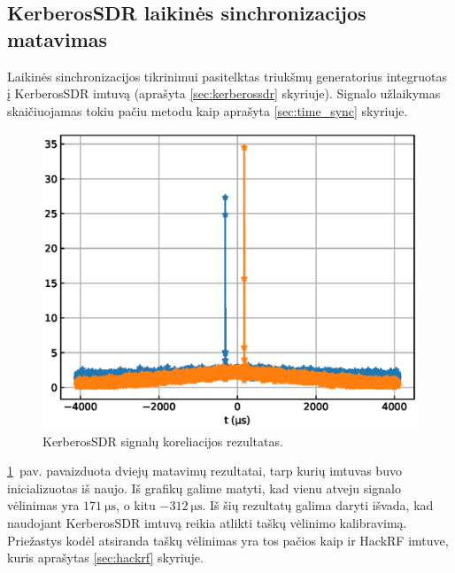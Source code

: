 \documentclass[main.tex]{subfiles}
\begin{document}
\subsection{KerberosSDR laikinės sinchronizacijos matavimas}\label{sec:kerberos_time_sync}

Laikinės sinchronizacijos tikrinimui pasitelktas triukšmų generatorius
integruotas į KerberosSDR imtuvą (aprašyta \ref{sec:kerberossdr} skyriuje).
Signalo užlaikymas skaičiuojamas tokiu pačiu metodu kaip aprašyta \ref{sec:time_sync} skyriuje.

\begin{figure}[h]
    \begin{centering}
    \includegraphics[scale=1.0]{drawings/kerberos_time_sync}
    \par\end{centering}
    \protect\caption{\label{fig:kerberos_timesync}KerberosSDR signalų koreliacijos rezultatas.}
\end{figure}

\ref{fig:kerberos_timesync}~pav. pavaizduota dviejų matavimų rezultatai, tarp kurių imtuvas
buvo inicializuotas iš naujo. Iš grafikų galime matyti, kad vienu atveju signalo
vėlinimas yra $171\ \mathrm{\mu s}$, o kitu $-312\ \mathrm{\mu s}$. Iš šių rezultatų galima
daryti išvada, kad naudojant KerberosSDR imtuvą reikia atlikti taškų vėlinimo kalibravimą.
Priežastys kodėl atsiranda taškų vėlinimas yra tos pačios kaip ir HackRF imtuve, kuris
aprašytas \ref{sec:hackrf} skyriuje.
\end{document}
